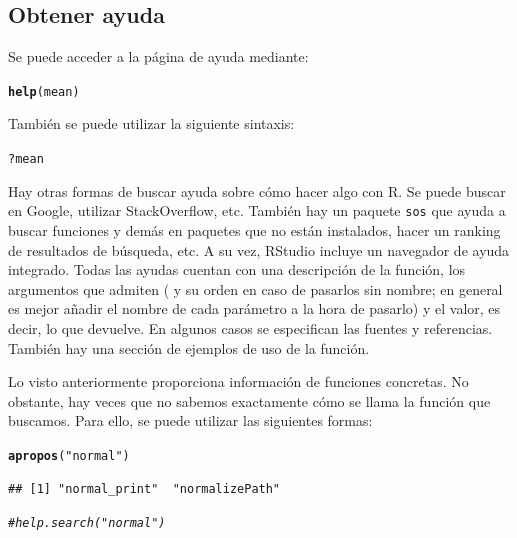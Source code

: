 \documentclass{config/apuntes}\usepackage[]{graphicx}\usepackage[]{xcolor}
\makeatletter
\newcommand{\hlsng}[1]{\textcolor[rgb]{0.192,0.494,0.8}{#1}}%
\newcommand{\hlcom}[1]{\textcolor[rgb]{0.678,0.584,0.686}{\textit{#1}}}%
\newcommand{\hlopt}[1]{\textcolor[rgb]{0,0,0}{#1}}%
\newcommand{\hldef}[1]{\textcolor[rgb]{0.345,0.345,0.345}{#1}}%
\newcommand{\hlkwd}[1]{\textcolor[rgb]{0.737,0.353,0.396}{\textbf{#1}}}%
\newenvironment{kframe}{%
 \def\at@end@of@kframe{}%
 \ifinner\ifhmode%
  \def\at@end@of@kframe{\end{minipage}}%
  \begin{minipage}{\columnwidth}%
 \fi\fi%
 \def\FrameCommand##1{\hskip\@totalleftmargin \hskip-\fboxsep
 \colorbox{shadecolor}{##1}\hskip-\fboxsep
     \hskip-\linewidth \hskip-\@totalleftmargin \hskip\columnwidth}%
 \MakeFramed {\advance\hsize-\width
   \@totalleftmargin\z@ \linewidth\hsize
   \@setminipage}}%
 {\par\unskip\endMakeFramed%
 \at@end@of@kframe}
\newenvironment{knitrout}{}{} %
\newcommand{\code}[1]{\texttt{#1}}
\makeatother
\begin{document}
\subsection{Obtener ayuda}
Se puede acceder a la página de ayuda mediante:
\begin{knitrout}
\color{fgcolor}\begin{kframe}
\begin{alltt}
\hlkwd{help}\hldef{(mean)}
\end{alltt}
\end{kframe}
\end{knitrout}

También se puede utilizar la siguiente sintaxis:
\begin{knitrout}
\color{fgcolor}\begin{kframe}
\begin{alltt}
\hlopt{?}\hldef{mean}
\end{alltt}
\end{kframe}
\end{knitrout}

Hay otras formas de buscar ayuda sobre cómo hacer algo con R. Se puede buscar en Google, utilizar StackOverflow, etc. También hay un paquete \code{sos} que ayuda a buscar funciones y demás en paquetes que no están instalados, hacer un ranking de resultados de búsqueda, etc. A su vez, RStudio incluye un navegador de ayuda integrado. Todas las ayudas cuentan con una descripción de la función, los argumentos que admiten ( y su orden en caso de pasarlos sin nombre; en general es mejor añadir el nombre de cada parámetro a la hora de pasarlo) y el valor, es decir, lo que devuelve. En algunos casos se especifican las fuentes y referencias. También hay una sección de ejemplos de uso de la función.

Lo visto anteriormente proporciona información de funciones concretas. No obstante, hay veces que no sabemos exactamente cómo se llama la función que buscamos. Para ello, se puede utilizar las siguientes formas:
\begin{knitrout}
\color{fgcolor}\begin{kframe}
\begin{alltt}
\hlkwd{apropos}\hldef{(}\hlsng{"normal"}\hldef{)}
\end{alltt}
\begin{verbatim}
## [1] "normal_print"  "normalizePath"
\end{verbatim}
\begin{alltt}
\hlcom{# help.search("normal")}
\end{alltt}
\end{kframe}
\end{knitrout}
\end{document}
